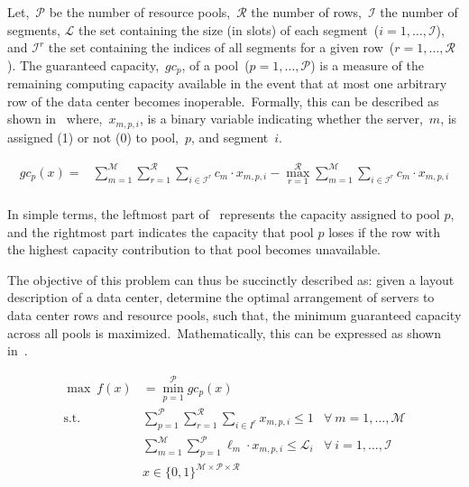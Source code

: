Let,~$\mathcal{P}$ be the number of resource pools,~$\mathcal{R}$ the number of
rows,~$\mathcal{I}$ the number of segments, $\mathcal{L}$ the set containing the
size (in slots) of each segment~($i = 1, \ldots, \mathcal{I}$), and
$\mathcal{I}^{r}$ the set containing the indices of all segments for a given
row~($r = 1, \ldots, \mathcal{R}$). The guaranteed capacity,~$gc_{p}$, of a
pool~($p = 1, \ldots, \mathcal{P}$) is a measure of the remaining computing
capacity available in the event that at most one arbitrary row of the data
center becomes inoperable.~Formally, this can be described as shown
in~ where,~$x_{m,p,i}$, is a binary variable
indicating whether the server,~$m$, is assigned (1) or not (0) to pool,~$p$, and
segment~$i$.

\begin{equation}
  \label{eq:guaranteed-capacity}
  \begin{aligned}
    gc_p(x)     = & \sum_{m=1}^\mathcal{M} \sum_{r=1}^\mathcal{R} \sum_{i \in \mathcal{I}^{r}} c_m \cdot x_{m,p,i} - \max_{r=1}^\mathcal{R} \sum_{m=1}^\mathcal{M} \sum_{i \in \mathcal{I}^r} c_m \cdot x_{m,p,i} \\
  \end{aligned}
\end{equation}

In simple terms, the leftmost part of~ represents
the capacity assigned to pool $p$, and the rightmost part indicates the capacity
that pool $p$ loses if the row with the highest capacity contribution to that
pool becomes unavailable.

The objective of this problem can thus be succinctly described as: given a
layout description of a data center, determine the optimal arrangement of
servers to data center rows and resource pools, such that, the minimum
guaranteed capacity across all pools is maximized.~Mathematically, this can be
expressed as shown in~.

\begin{equation}
  \label{eq:objective}
  \begin{aligned}
    \max\ f(x)   & = \min_{p=1}^\mathcal{P}{gc_{p}(x)}                                                                                              \\
    \text{s.t. } & \sum_{p=1}^{\mathcal{P}} \sum_{r=1}^{\mathcal{R}} \sum_{i \in I^{r}} x_{m,p,i} \le 1         & \forall\ m=1,\ldots,\mathcal{M}   \\
                 & \sum_{m=1}^{\mathcal{M}} \sum_{p=1}^{\mathcal{P}} \ell_m \cdot x_{m,p,i} \le \mathcal{L}_{i} & \forall\  i=1,\ldots, \mathcal{I} \\
                 & x \in {\{0,1\}}^{\mathcal{M} \times \mathcal{P} \times \mathcal{R}}                                                              \\
  \end{aligned}
\end{equation}

